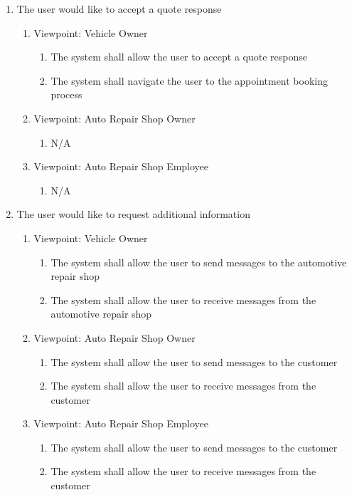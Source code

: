 \documentclass[12pt]{article}
\begin{document}
\begin{enumerate}[resume*=business_events]
	\item The user would like to accept a quote response
	      \begin{enumerate}[VP\arabic*.]
		      \item Viewpoint: Vehicle Owner
		            \begin{enumerate}
			            \item The system shall allow the user to accept a quote response
			            \item The system shall navigate the user to the appointment booking process
		            \end{enumerate}
		      \item Viewpoint: Auto Repair Shop Owner
		            \begin{enumerate}
			            \item[] N/A
		            \end{enumerate}
		      \item Viewpoint: Auto Repair Shop Employee
		            \begin{enumerate}
			            \item[] N/A
		            \end{enumerate}
	      \end{enumerate}

	\item The user would like to request additional information
	      \begin{enumerate}[VP\arabic*.]
		      \item Viewpoint: Vehicle Owner
		            \begin{enumerate}
			            \item The system shall allow the user to send messages to the automotive repair shop
			            \item The system shall allow the user to receive messages from the automotive repair shop
		            \end{enumerate}
		      \item Viewpoint: Auto Repair Shop Owner
		            \begin{enumerate}
			            \item The system shall allow the user to send messages to the customer
			            \item The system shall allow the user to receive messages from the customer
		            \end{enumerate}
		      \item Viewpoint: Auto Repair Shop Employee
		            \begin{enumerate}
			            \item The system shall allow the user to send messages to the customer
			            \item The system shall allow the user to receive messages from the customer
		            \end{enumerate}
	      \end{enumerate}
\end{enumerate}
\end{document}
